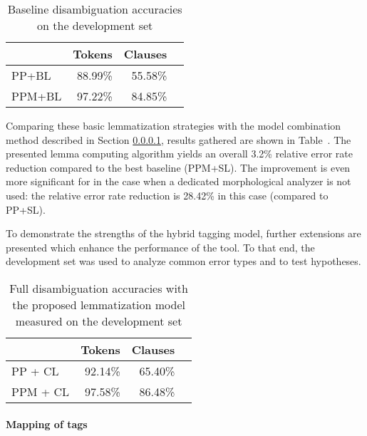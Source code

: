 \begin{table}[ht]
\centering
\caption{Baseline disambiguation accuracies on the development set}\label{tab:baselines}
\begin{tabular}{l r r r}
\hline
 & Tokens & Clauses \\
\hline
PP+BL  & 88.99\% & 55.58\% \\
PPM+BL  & 97.22\% & 84.85\% \\
\hline
\end{tabular}
\end{table}

Comparing these basic lemmatization strategies with the model combination method described in Section \ref{}, results gathered are shown in Table~\cite{tab:pp}.
The presented lemma computing algorithm yields an overall 3.2\% relative error rate reduction compared to the best baseline (PPM+SL).
The improvement is even more significant for in the case when a dedicated morphological analyzer is not used: the relative error rate reduction is 28.42\% in this case (compared to PP+SL).

To demonstrate the strengths of the hybrid tagging model, further extensions are presented which enhance the performance of the tool.
To that end, the development set was used to analyze common error types and to test hypotheses.

\begin{table}[ht]
\centering
\caption{Full disambiguation accuracies with the proposed lemmatization model measured on the development set}\label{tab:pp}
\begin{tabular}{l r r r}
\hline
& Tokens & Clauses \\
\hline
PP + CL & 92.14\% & 65.40\% \\
PPM + CL & 97.58\% & 86.48\% \\
\hline
\end{tabular}
\end{table}

\paragraph{Mapping of tags}

